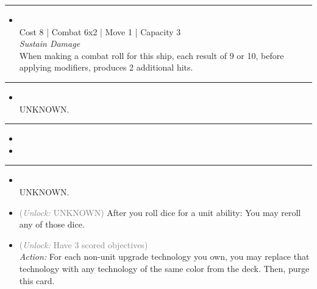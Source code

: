 \begin{multicols}{2}
\vspace{-10pt}\rule{\hsize}{0.4pt}\vspace{5pt}


\begin{itemize}
\item {}\\
Cost 8 | Combat 6x2 | Move 1 | Capacity 3 \\
\emph{Sustain Damage}\\
When making a combat roll for this ship, each result of 9 or 10, before applying modifiers, produces 2 additional hits.
\end{itemize}

\vspace{-10pt}\rule{\hsize}{0.4pt}\vspace{5pt}


\begin{itemize}
\item {}
\\
UNKNOWN.
\end{itemize}

\vspace{-10pt}\rule{\hsize}{0.4pt}\vspace{5pt}

\nounits

\columnbreak
{}

\begin{itemize}
\item \cylinder
\item \eres
\end{itemize}

\vspace{-10pt}\rule{\hsize}{0.4pt}\vspace{5pt}


\begin{itemize}
\item {}\\
UNKNOWN.
\item {} \textcolor{gray}{(\emph{Unlock:} UNKNOWN)}
After you roll dice for a unit ability: You may reroll any of those dice.
\item {} \textcolor{gray}{(\emph{Unlock:} Have 3 scored objectives)}\\
\emph{Action:} For each non-unit upgrade technology you own, you may replace that technology with any technology of the same color from the deck. Then, purge this card. 
\end{itemize}


\end{multicols}
